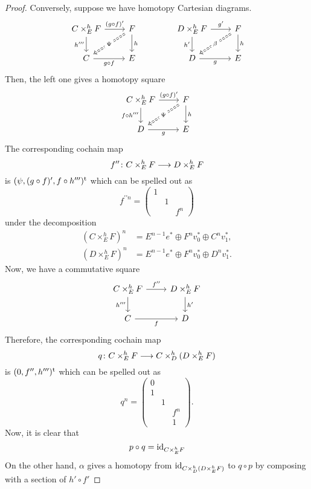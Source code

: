 \begin{proof}
Conversely, 
suppose we have homotopy Cartesian diagrams. 
\[
\begin{tikzcd}
{C\times^h_EF}\ar{r}{(g\circ f)'}\ar{d}[']{h'''} & 
F\ar{d}{h}
\ar[dl,Rightarrow,dashed,"{\Psi}"description] \\
C\ar{r}[']{g\circ f} & 
E
\end{tikzcd}
\qquad\qquad
\begin{tikzcd}
{D\times^h_EF}\ar{r}{g'}\ar{d}[']{h'} & 
F\ar{d}{h}
\ar[dl,Rightarrow,dashed,"{\beta}"description] \\
D\ar{r}[']{g} & 
E
\end{tikzcd}
\]
Then, the left one gives a homotopy square
\[
\begin{tikzcd}
{C\times^h_EF}\ar{r}{(g\circ f)'}\ar{d}[']{f\circ h'''} & 
F\ar{d}{h}
\ar[dl,Rightarrow,dashed,"{\Psi}"description] \\
D\ar{r}[']{g} & 
E
\end{tikzcd}
\]
The corresponding cochain map
\[
f''\colon C\times^h_EF\longrightarrow D\times^h_EF
\]
is $(\psi,(g\circ f)',f\circ h''')^{\rm t}$ 
which can be spelled out as
\[
f^{\prime\prime n}=
\begin{pmatrix}
1 & & \\
& 1 & \\
& & f^n
\end{pmatrix}
\]
under the decomposition
\begin{align*}
(C\times^h_EF)^n &=
E^{n-1}e^{\ast}\oplus F^nv_0^{\ast}\oplus C^nv_1^{\ast},\\
(D\times^h_EF)^n &=
E^{n-1}e^{\ast}\oplus F^nv_0^{\ast}\oplus D^nv_1^{\ast}.
\end{align*}
Now, we have a commutative square 
\[
\begin{tikzcd}
{C\times^h_EF}\ar{r}{f''}\ar{d}[']{h'''} & 
{D\times^h_EF}\ar{d}{h'} \\
C\ar{r}[']{f} & 
D
\end{tikzcd}
\]
Therefore, the corresponding cochain map 
\[
q\colon {C\times^h_EF}\longrightarrow{C\times^h_D(D\times^h_EF)}
\]
is $(0,f'',h''')^{\rm t}$ which can be spelled out as 
\[
q^n=
\begin{pmatrix}
0 & & \\
1 & & \\
& 1 & \\
& & f^n \\
& & 1
\end{pmatrix}.
\] 
Now, it is clear that 
\[
p\circ q = \operatorname{id}_{C\times^h_EF}
\]
On the other hand, $\alpha$ gives a homotopy 
from $\operatorname{id}_{C\times^h_D(D\times^h_EF)}$ 
to $q\circ p$ by composing with a section of $h'\circ f'$
\end{proof}

